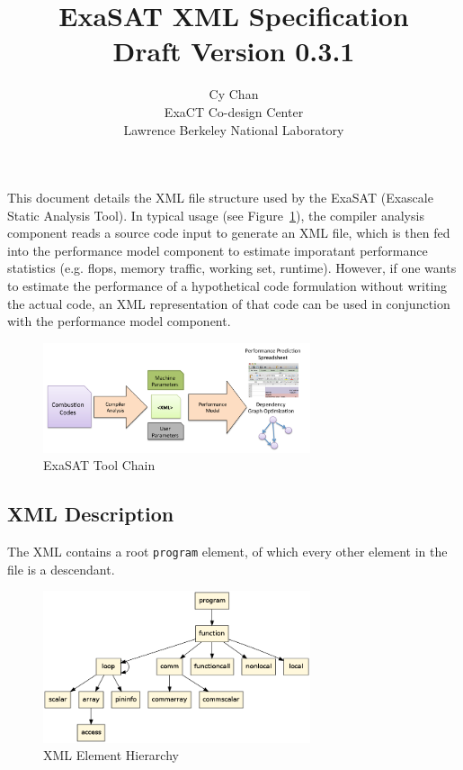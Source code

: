 \documentclass{article}
\title{ExaSAT XML Specification \\ {\large Draft Version 0.3.1}}
\author{Cy Chan \\ ExaCT Co-design Center \\ Lawrence Berkeley National Laboratory}
\begin{document}
\maketitle

This document details the XML file structure used by the ExaSAT (Exascale
Static Analysis Tool).  In typical usage (see Figure~\ref{fig:toolchain}),
the compiler analysis component reads a source code input to generate
an XML file, which is then fed into the performance model component to
estimate imporatant performance statistics (e.g. flops, memory traffic,
working set, runtime).  However, if one wants to estimate the performance
of a hypothetical code formulation without writing the actual code,
an XML representation of that code can be used in conjunction with the
performance model component.

\begin{figure}[ht]
  \begin{center}
    \includegraphics[width=0.7\textwidth]{figs/toolchain}
    \caption{ExaSAT Tool Chain}
    \label{fig:toolchain}
  \end{center}
\end{figure}

\subsection{XML Description}

The XML contains a root {\tt program} element, of which every other
element in the file is a descendant.

\vspace{6mm}
\begin{figure}[ht]
  \begin{center}
    \includegraphics[width=0.7\textwidth]{figs/xml.png}
    \caption{XML Element Hierarchy}
    \label{fig:xml}
  \end{center}
\end{figure}
\end{document}
